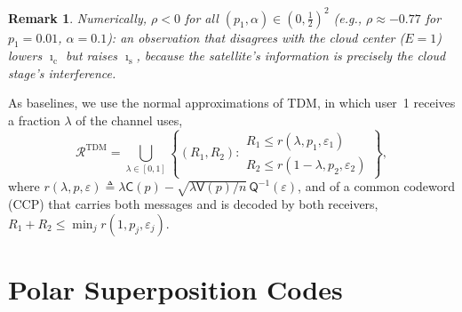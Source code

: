 \documentclass[conference]{IEEEtran}
\newtheorem{remark}{Remark}
\newcommand{\Qinv}{\mathsf{Q}^{-1}}
\newcommand{\Vsf}{\mathsf{V}}
\newcommand{\Csf}{\mathsf{C}}
\newcommand{\Rs}{\mathcal{R}}
\begin{document}
\begin{remark}
Numerically, $\rho<0$ for all $(p_1,\alpha)\in(0,\frac12)^2$ (e.g., $\rho\approx-0.77$ for $p_1=0.01$, $\alpha=0.1$): an observation that disagrees with the cloud center ($E=1$) lowers $\imath_{\mathrm c}$ but raises $\imath_{\mathrm s}$, because the satellite's information is precisely the cloud stage's interference.
\end{remark}

As baselines, we use the normal approximations of TDM, in which user~1 receives a fraction $\lambda$ of the channel uses,
\begin{equation}
\Rs^{\mathrm{TDM}}=\bigcup_{\lambda\in[0,1]}\left\{(R_1,R_2):\begin{array}{l}R_1\leq r(\lambda,p_1,\varepsilon_1)\\R_2\leq r(1-\lambda,p_2,\varepsilon_2)\end{array}\right\},
\label{eq:tdm}
\end{equation}
where $r(\lambda,p,\varepsilon)\triangleq\lambda\Csf(p)-\sqrt{\lambda\Vsf(p)/n}\,\Qinv(\varepsilon)$, and of a common codeword (CCP) that carries both messages and is decoded by both receivers, $R_1+R_2\leq\min_j r(1,p_j,\varepsilon_j)$.

\section{Polar Superposition Codes}
\end{document}
